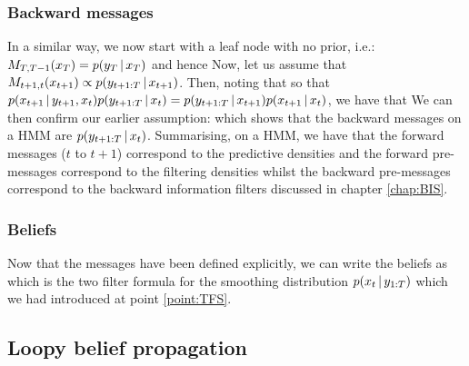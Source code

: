\subsubsection{Backward messages}
In a similar way, we now start with a leaf node with no prior, i.e.: $M_{T,T-1}(x_{T})=p(y_{T}\,|\, x_{T})$ and hence
%
%
Now, let us assume that $M_{t+1, t}(x_{t+1}) \propto p(y_{t+1:T}\,|\, x_{t+1})$. Then, noting that
%
%
so that $p(x_{t+1}\,|\, y_{t+1},x_{t})p(y_{t+1:T}\,|\, x_{t}) = p(y_{t+1:T}\,|\, x_{t+1})p(x_{t+1}\,|\, x_{t})$, we have that
%
%
We can then confirm our earlier assumption:
which shows that the backward messages on a HMM are  $p(y_{t+1:T}\,|\, x_{t})$.
Summarising, on a HMM, we have that the forward messages ($t$ to $t+1$) correspond to the predictive densities and the forward pre-messages correspond to the filtering densities whilst the backward pre-messages correspond to the backward information filters discussed in chapter \ref{chap:BIS}.

\subsubsection{Beliefs}
Now that the messages have been defined explicitly, we can write the beliefs as
%
%
which is the two filter formula for the smoothing distribution $p(x_{t}\,|\, y_{1:T})$ which we had introduced at point \ref{point:TFS}.

\subsection{\label{point:LBP}Loopy belief propagation}

